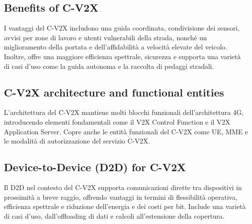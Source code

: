 \subsection{Benefits of C-V2X}
I vantaggi del C-V2X includono una guida coordinata, condivisione dei sensori, avvisi per
zone di lavoro e utenti vulnerabili della strada, nonché un miglioramento della portata e
dell'affidabilità a velocità elevate del veicolo. Inoltre, offre una maggiore efficienza
spettrale, sicurezza e supporta una varietà di casi d'uso come la guida autonoma e la
raccolta di pedaggi stradali.

\subsection{C-V2X architecture and functional entities}
L'architettura del C-V2X mantiene molti blocchi funzionali dell'architettura 4G,
introducendo elementi fondamentali come il V2X Control Function e il V2X Application
Server. Copre anche le entità funzionali del C-V2X come UE, MME e le modalità di
autorizzazione del servizio C-V2X.

\subsection{Device-to-Device (D2D) for C-V2X}
Il D2D nel contesto del C-V2X supporta comunicazioni dirette tra dispositivi in prossimità
a breve raggio, offrendo vantaggi in termini di flessibilità operativa, efficienza
spettrale e riduzione dell'energia e dei costi per bit. Include una varietà di casi d'uso,
dall'offloading di dati e calcoli all'estensione della copertura.

